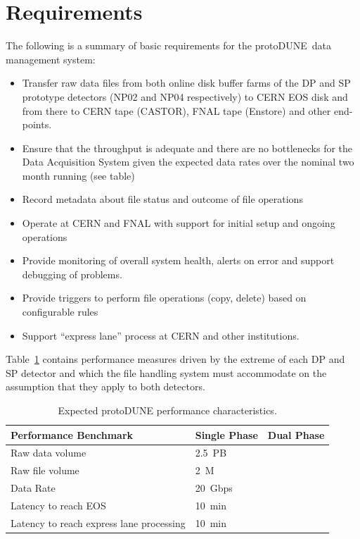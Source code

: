 \documentclass[pdftex,12pt,letter]{article}
\newcommand{\pd}{protoDUNE\ }
\begin{document}
\section{Requirements}

The following is a summary of basic requirements for the \pd data management system:
\begin{itemize}
\item Transfer raw data files from both online disk buffer farms of the DP and SP prototype detectors (NP02 and NP04 respectively) to CERN EOS disk and from there to CERN tape (CASTOR), FNAL tape (Enstore) and other end-points.
\item Ensure that the throughput is adequate and there are no bottlenecks for the Data Acquisition System given the expected data rates over the nominal two month running (see table)
\item Record metadata about file status and outcome of file operations
\item Operate at CERN and FNAL with support for initial setup and ongoing operations
\item Provide monitoring of overall system health, alerts on error and support debugging of problems.
\item Provide triggers to perform file operations (copy, delete) based on configurable rules
\item Support “express lane” process at CERN and other institutions.
\end{itemize}

Table~\ref{fig:det_perf} contains performance measures driven by the extreme of each DP and SP detector and which the file handling system must accommodate on the assumption that they apply to both detectors.


\begin{table}[tbh]
\centering
\begin{tabular}{l l l}
\hline
\textbf{Performance Benchmark} & \textbf{Single Phase} & \textbf{Dual Phase}\\
\hline
\hline
Raw data volume                          & 2.5~PB & \\
Raw file volume                          & 2~M  & \\
Data Rate                                & 20~Gbps & \\
Latency to reach EOS                     & 10~min & \\
Latency to reach express lane processing & 10~min &\\
\hline
\end{tabular}
\caption{\label{fig:det_perf}Expected protoDUNE performance characteristics.}
\end{table}
\end{document}
